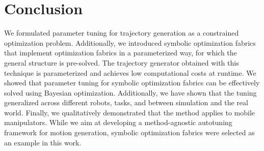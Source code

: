 \section{Conclusion}%
\label{sec:conclusion}
%
We formulated parameter tuning for trajectory generation as a constrained
optimization problem. Additionally, we introduced symbolic optimization fabrics
that implement optimization fabrics in a parameterized way, for which the
general structure is pre-solved. The trajectory generator obtained with this
technique is parameterized and achieves low computational costs at runtime. We
showed that parameter tuning for symbolic optimization fabrics can be
effectively solved using Bayesian optimization. Additionally, we have shown
that the tuning generalized across different robots, tasks, and between
simulation and the real world. Finally, we qualitatively demonstrated that the
method applies to mobile manipulators. 
While we aim at developing a method-agnostic autotuning framework for motion
generation, symbolic optimization fabrics were selected as an example in 
this work.

